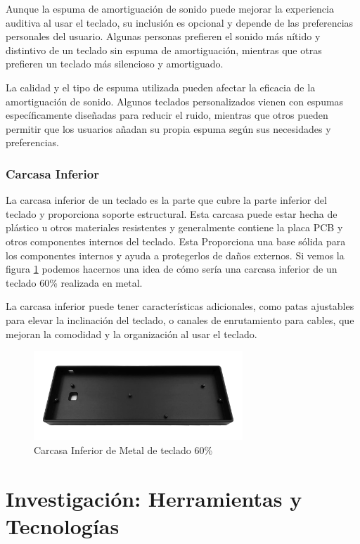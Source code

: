 Aunque la espuma de amortiguación de sonido puede mejorar la experiencia auditiva al usar el teclado, su inclusión es opcional y depende de las preferencias personales del usuario. Algunas personas prefieren el sonido más nítido y distintivo de un teclado sin espuma de amortiguación, mientras que otras prefieren un teclado más silencioso y amortiguado.

La calidad y el tipo de espuma utilizada pueden afectar la eficacia de la amortiguación de sonido. Algunos teclados personalizados vienen con espumas específicamente diseñadas para reducir el ruido, mientras que otros pueden permitir que los usuarios añadan su propia espuma según sus necesidades y preferencias.

\subsubsection{Carcasa Inferior}

La carcasa inferior de un teclado es la parte que cubre la parte inferior del teclado y proporciona soporte estructural. Esta carcasa puede estar hecha de plástico u otros materiales resistentes y generalmente contiene la placa \gls{PCB} y otros componentes internos del teclado. Esta Proporciona una base sólida para los componentes internos y ayuda a protegerlos de daños externos. Si vemos la figura \ref{fig:BottomCase} podemos hacernos una idea de cómo sería una carcasa inferior de un teclado 60\% realizada en metal.

La carcasa inferior puede tener características adicionales, como patas ajustables para elevar la inclinación del teclado, o canales de enrutamiento para cables, que mejoran la comodidad y la organización al usar el teclado.

\begin{figure}[H]
    \centering
    \includegraphics[width=0.7\textwidth]{imagenes/Capitulos/Cap03/BottomCase.png}
    \caption{Carcasa Inferior de Metal de teclado 60\%}
    \label{fig:BottomCase}
\end{figure}

\section{Investigación: Herramientas y Tecnologías}

